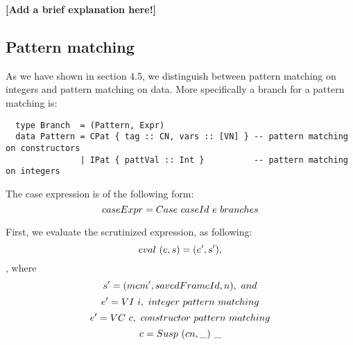 \documentclass[diploma]{softlab-thesis}
\begin{document}
\textbf{[Add a brief explanation here!]}

\subsection{Pattern matching}

As we have shown in section 4.5, we distinguish between pattern matching on integers and pattern matching on data. 
More specifically a branch for a pattern matching is:
\begin{verbatim}
  type Branch  = (Pattern, Expr)
  data Pattern = CPat { tag :: CN, vars :: [VN] } -- pattern matching on constructors 
               | IPat { pattVal :: Int }          -- pattern matching on integers 
\end{verbatim}

The case expression is of the following form:
\[caseExpr = Case \hfill\ caseId \hfill\ e \hfill\ branches \]

First, we evaluate the scrutinized expression, as following:
\[eval \hfill\ (e, s) = (e', s'),  \]
, where 
\[s' = (mem', savedFrameId, n), \hfill\ and \]
\[e' = VI \hfill\ i, \hfill\ integer \hfill\ pattern \hfill\ matching \] 
\[e' = VC \hfill\ c, \hfill\ constructor \hfill\ pattern \hfill\ matching \]
\[c = Susp \hfill\ (cn, \_) \hfill\ \_ \]
\end{document}
